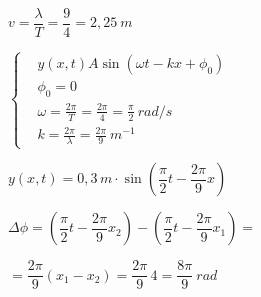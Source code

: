 \begin{solapartat}
 $v = \dfrac{\lambda}{T} = \dfrac{9}{4} = 2,25\ m$

 $\left\{\begin{aligned} &y(x, t) A\sin(\omega t - kx + \phi_0)\\ &\phi_0 = 0\\ &\omega = \frac{2\pi}{T} = \frac{2\pi}{4} = \frac{\pi}{2}\ rad/s\\ &k = \frac{2\pi}{\lambda} = \frac{2\pi}{9}\ m^{-1} \end{aligned}\right.$

\medskip
{} $y(x, t) = 0,3\,m\cdot\sin\left(\dfrac{\pi}{2}t - \dfrac{2\pi}{9}x\right)$
\end{solapartat}

\begin{solapartat}
 $\Delta\phi = \left(\dfrac{\pi}{2}t - \dfrac{2\pi}{9}x_2\right) - \left(\dfrac{\pi}{2}t - \dfrac{2\pi}{9}x_1\right) =$

 $= \dfrac{2\pi}{9}(x_1 - x_2) = \dfrac{2\pi}{9}\,4 = \dfrac{8\pi}{9}\ rad$
\end{solapartat}
